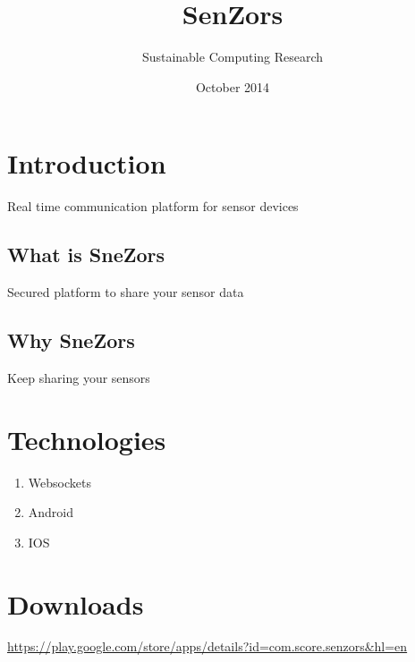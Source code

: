 \documentclass{article}
\title{SenZors}
\author{Sustainable Computing Research}
\date{October 2014}
\begin{document}
  \maketitle

\section{Introduction}

    Real time communication platform for sensor devices

    \subsection{What is SneZors}

      Secured platform to share your sensor data

    \subsection{Why SneZors}

      Keep sharing your sensors

  \section{Technologies}

    \begin{enumerate}
      \item Websockets
      \item Android
      \item IOS
    \end{enumerate}

  \section{Downloads}

    \url{https://play.google.com/store/apps/details?id=com.score.senzors&hl=en}
\end{document}
